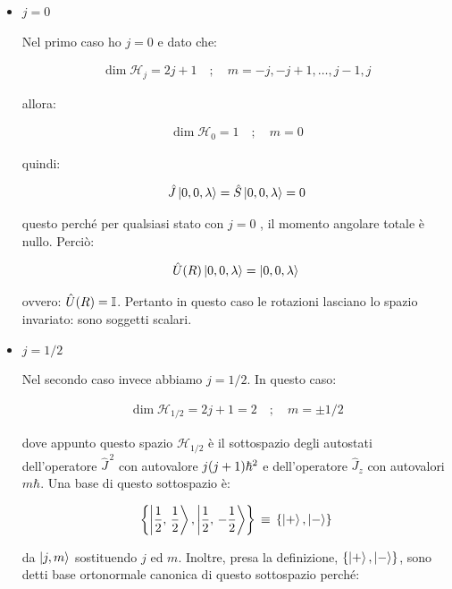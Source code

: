 \begin{itemize}
	\item $j = 0$
		
		Nel primo caso ho $j = 0$ e dato che:
	
\begin{align*}	
	\dim \mathcal{H}_j = 2j + 1 \quad ; \quad m = -j, -j + 1, \ldots, j-1, j
\end{align*}

	allora:

\begin{align*}	
	\dim \mathcal{H}_0 = 1 \quad ; \quad m = 0
\end{align*}

	quindi:
	
	\begin{align*}
		\hat{J} \ket{0, 0, \lambda} = \hat{S} \ket{0, 0, \lambda} = 0
	\end{align*}
	
	questo perché per qualsiasi stato con $j = 0$ , il momento angolare totale è nullo. Perciò:
	
	\begin{align*}
		\hat{U}\qty(R) \ket{0, 0, \lambda} = \ket{0, 0, \lambda} 
	\end{align*}
	
	ovvero: $\hat{U}\qty(R) = \mathbb{I}$. Pertanto in questo caso le rotazioni lasciano lo spazio invariato: sono soggetti scalari.

	\item $j = 1/2$
		
		Nel secondo caso invece abbiamo $j = 1/2$. In questo caso:
		
	\begin{align*}
		\dim \mathcal{H}_{1/2} = 2j +1 = 2 \quad ; \quad m = \pm 1/2
	\end{align*}
	
		dove appunto questo spazio $\mathcal{H}_{1/2}$ è il sottospazio degli autostati dell’operatore $\hat{J}^{\, 2}$ con autovalore $j\qty(j + 1)\hbar^2$ e dell'operatore $\hat{J}_z$ con autovalori $m\hbar$. Una base di questo sottospazio è:
		
	\begin{align*}
		\qty{\ket{\frac{1}{2},\, \frac{1}{2} }, \ket{\frac{1}{2},\, -\frac{1}{2} }  } \, \equiv \, \qty{\ket{+}, \ket{-}}
	\end{align*}
	
		da $\ket{j, m}$ sostituendo $j$ ed $m$. Inoltre, presa la definizione, $\qty{\ket{+}, \ket{-}}$, sono detti base ortonormale canonica di questo sottospazio perché:
		

\end{itemize}
